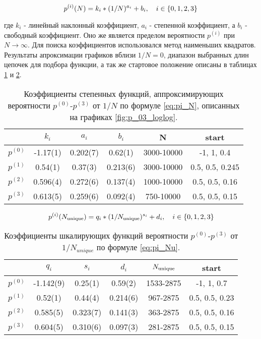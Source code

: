 \begin{equation}
p^{(i)}(N) = k_i * (1/N)^{a_i} + b_i, \ \ \ i \in \{ 0,1,2,3\} \\
\label{eq:pi_N}
\end{equation}

где $k_i$ - линейный наклонный коэффициент, $a_i$ - степенной коэффициент, а $b_i$ - свободный коэффициент. 
Оно же является пределом вероятности $p^{(i)}$ при $N \to \infty$.
Для поиска коэффициентов использовался метод наименьших квадратов.
Результаты апроксимации графиков вблизи $1/N = 0$, диапазон выбранных длин цепочек для подбора функции,
а так же стартовое положение описаны в таблицах \ref{tab:p_i_log_log} и \ref{tab:p_i_u_log_log}. 

\begin{table}[h] 
\centering
\begin{tabular}{|c|c|c|c|c|c|}
\hline
 & $k_i$ & $a_i$ & $b_i$ & N & start  \\ \hline
$p^{(0)}$ & -1.17(1) & 0.202(7) & 0.62(1) & 3000-10000 & -1, 1, 0.4 \\ \hline 
$p^{(1)}$ & 0.54(1) & 0.37(3) & 0.213(6) & 3000-10000 & 0.5, 0.5, 0.245 \\ \hline
$p^{(2)}$ & 0.596(4) & 0.272(6) & 0.137(4) & 1000-10000 & 0.5, 0.5, 0.16 \\ \hline
$p^{(3)}$ & 0.613(5) & 0.259(6) & 0.092(4) & 750-10000 & 0.5, 0.5, 0.15 \\ \hline
\end{tabular}
\caption{Коэффициенты степенных функций, аппроксимирующих вероятности $p^{(0)}$-$p^{(3)}$ от $1/N$ по формуле \eqref{eq:pi_N}, описанных на графиках \ref{fig:p_03_loglog}.}
\label{tab:p_i_log_log}
\end{table}

\begin{equation}
p^{(i)}(N_{\textup{unique}}) = q_i * (1/N_{\textup{unique}})^{s_i} + d_i, \ \ \ i \in \{ 0,1,2,3\}
\label{eq:pi_Nu}
\end{equation}

\begin{table}[h]
\centering
\begin{tabular}{|c|c|c|c|c|c|} \hline
 & $q_i$ & $s_i$ & $d_i$ & $N_{\textup{unique}}$ & start  \\ \hline
$p^{(0)}$ & -1.142(9) & 0.25(1) & 0.59(2) & 1533-2875 &  -1, 1, 0.7 \\ \hline
$p^{(1)}$ & 0.52(1) & 0.44(4) & 0.214(6) & 967-2875 & 0.5, 0.5, 0.23\\ \hline
$p^{(2)}$ & 0.585(5) & 0.323(7) & 0.141(3) & 363-2875  & 0.5, 0.5, 0.16\\ \hline
$p^{(3)}$ & 0.604(5) & 0.310(6) & 0.097(3) & 281-2875 & 0.5, 0.5, 0.15\\ \hline
\end{tabular}

\caption{Коэффициенты шкалирующих функций вероятности $p^{(0)}$-$p^{(3)}$ от $1/N_{unique}$ по формуле \eqref{eq:pi_Nu}.}
\label{tab:p_i_u_log_log}
\end{table}

